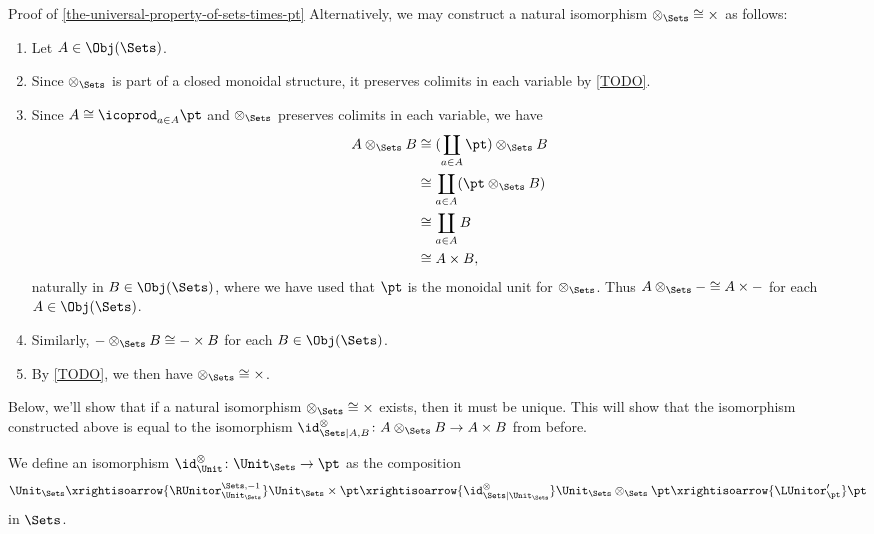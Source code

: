\begin{Proof}{Proof of \cref{the-universal-property-of-sets-times-pt}}
    Alternatively, we may construct a natural isomorphism $\mathord{\otimes_{\Sets}}\cong\mathord{\times}$ as follows:
    \begin{enumerate}
        \item\label{proof-of-the-universal-property-of-sets-times-pt-constructing-an-isomorphism-otimes-times-1}Let $A\in\Obj(\Sets)$.
        \item\label{proof-of-the-universal-property-of-sets-times-pt-constructing-an-isomorphism-otimes-times-2}Since $\otimes_{\Sets}$ is part of a closed monoidal structure, it preserves colimits in each variable by \cref{TODO}.
        \item\label{proof-of-the-universal-property-of-sets-times-pt-constructing-an-isomorphism-otimes-times-3}Since $A\cong\icoprod_{a\in A}\pt$ and $\otimes_{\Sets}$ preserves colimits in each variable, we have
            \begin{align*}
                A\otimes_{\Sets}B &\cong (\coprod_{a\in A}\pt)\otimes_{\Sets}B\\
                                  &\cong \coprod_{a\in A}(\pt\otimes_{\Sets}B)\\
                                  &\cong \coprod_{a\in A}B\\
                                  &\cong A\times B,
            \end{align*}
            naturally in $B\in\Obj(\Sets)$, where we have used that $\pt$ is the monoidal unit for $\otimes_{\Sets}$. Thus $A\otimes_{\Sets}-\cong A\times-$ for each $A\in\Obj(\Sets)$.
        \item\label{proof-of-the-universal-property-of-sets-times-pt-constructing-an-isomorphism-otimes-times-4}Similarly, $-\otimes_{\Sets}B\cong-\times B$ for each $B\in\Obj(\Sets)$.
        \item\label{proof-of-the-universal-property-of-sets-times-pt-constructing-an-isomorphism-otimes-times-5}By \cref{TODO}, we then have $\mathord{\otimes_{\Sets}}\cong\mathord{\times}$.
    \end{enumerate}
    Below, we'll show that if a natural isomorphism $\mathord{\otimes_{\Sets}}\cong\mathord{\times}$ exists, then it must be unique. This will show that the isomorphism constructed above is equal to the isomorphism $\id^{\otimes}_{\Sets|A,B}\colon A\otimes_{\Sets}B\to A\times B$ from before.

    We define an isomorphism $\id^{\otimes}_{\Unit}\colon\Unit_{\Sets}\to\pt$ as the composition
    \[
        \Unit_{\Sets}%
        \xrightisoarrow{\RUnitor^{\Sets,-1}_{\Unit_{\Sets}}}%
        \Unit_{\Sets}\times\pt%
        \xrightisoarrow{\id^{\otimes}_{\Sets|\Unit_{\Sets}}}%
        \Unit_{\Sets}\otimes_{\Sets}\pt%
        \xrightisoarrow{\LUnitor'_{\pt}}%
        \pt%
    \]%
    in $\Sets$.


\end{Proof}
